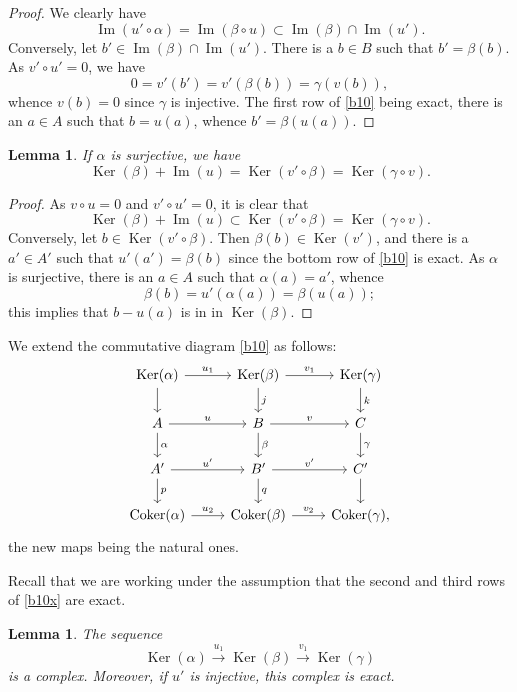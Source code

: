 \documentclass[parskip=half,fontsize=12pt]{scrartcl}%
\newcommand{\oo}{\operatorname}\newcommand{\ooo}{\operatorname*}
\newcommand{\xr}{\xrightarrow}
\newtheorem{lem}[thm]{Lemma}
\begin{document}
\begin{proof}
We clearly have 
$$
\oo{Im}(u'\circ\alpha)=\oo{Im}(\beta\circ u)\subset\oo{Im}(\beta)\cap\oo{Im}(u').
$$ 
Conversely, let $b'\in\oo{Im}(\beta)\cap\oo{Im}(u')$. There is a $b\in B$ such that $b'=\beta(b)$. As $v'\circ u'=0$, we have 
$$
0=v'(b')=v'(\beta(b))=\gamma(v(b)),
$$ 
whence $v(b)=0$ since $\gamma$ is injective. The first row of \eqref{b10} being exact, there is an $a\in A$ such that $b=u(a)$, whence $b'=\beta(u(a))$.
\end{proof}

\begin{lem}\label{b1ii}
If $\alpha$ is surjective, we have 
$$
\oo{Ker}(\beta)+\oo{Im}(u)=\oo{Ker}(v'\circ\beta)=\oo{Ker}(\gamma\circ v).
$$
\end{lem}

\begin{proof}
As $v\circ u=0$ and $v'\circ u'=0$, it is clear that 
$$
\oo{Ker}(\beta)+\oo{Im}(u)\subset\oo{Ker}(v'\circ\beta)=\oo{Ker}(\gamma\circ v).
$$ 
Conversely, let $b\in\oo{Ker}(v'\circ\beta)$. Then $\beta(b)\in\oo{Ker}(v')$, and there is a $a'\in A'$ such that $u'(a')=\beta(b)$ since the bottom row of \eqref{b10} is exact. As $\alpha$ is surjective, there is an $a\in A$ such that $\alpha(a)=a'$, whence 
$$
\beta(b)=u'(\alpha(a))=\beta(u(a));
$$ 
this implies that $b-u(a)$ is in in $\oo{Ker}(\beta)$.
\end{proof}

We extend the commutative diagram \eqref{b10} as follows:
\begin{equation}\label{b10x}
\begin{tikzcd}
\oo{Ker}(\alpha)\ar[d]\ar[r,"u_1"]&\oo{Ker}(\beta)\ar[d,"j"]\ar[r,"v_1"]&\oo{Ker}(\gamma)\ar[d,"k"]\\ 
A\ar[d,"\alpha"]\ar[r,"u"]&B\ar[d,"\beta"]\ar[r,"v"]&C\ar[d,"\gamma"]\\ 
A'\ar[d,"p"]\ar[r,"u'"]&B'\ar[d,"q"]\ar[r,"v'"]&C'\ar[d]\\ 
\oo{Coker}(\alpha)\ar[r,"u_2"]&\oo{Coker}(\beta)\ar[r,"v_2"]&\oo{Coker}(\gamma),
\end{tikzcd}
\end{equation} 
the new maps being the natural ones.

Recall that we are working under the assumption that the second and third rows of \eqref{b10x} are exact.

\begin{lem}\label{b2i}
The sequence 
$$
\oo{Ker}(\alpha)\xr{u_1}\oo{Ker}(\beta)\xr{v_1}\oo{Ker}(\gamma)
$$ 
is a complex. Moreover, if $u'$ is injective, this complex is exact.
\end{lem}
 
\end{document}
